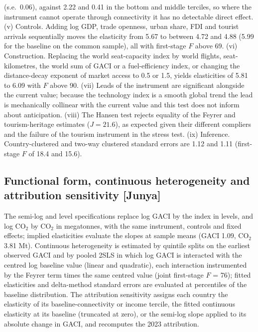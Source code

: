 \documentclass[12pt]{article}
\begin{document}
(s.e.\ 0.06), against 2.22 and 0.41 in the bottom and middle terciles, so
where the instrument cannot operate through connectivity it has no
detectable direct effect. (v) Controls. Adding log GDP, trade openness,
urban share, FDI and tourist arrivals sequentially moves the elasticity
from 5.67 to between 4.72 and 4.88 (5.99 for the baseline on the common
sample), all with first-stage $F$ above 69. (vi) Construction. Replacing
the world seat-capacity index by world flights, seat-kilometres, the world
sum of GACI or a fuel-efficiency index, or changing the distance-decay
exponent of market access to 0.5 or 1.5, yields elasticities of 5.81 to
6.09 with $F$ above 90. (vii) Leads of the instrument are significant
alongside the current value; because the technology index is a smooth
global trend the lead is mechanically collinear with the current value and
this test does not inform about anticipation. (viii) The Hansen test
rejects equality of the Feyrer and tourism-heritage estimates ($J =
21.6$), as expected given their different compliers and the failure of the
tourism instrument in the stress test. (ix) Inference. Country-clustered
and two-way clustered standard errors are 1.12 and 1.11 (first-stage $F$
of 18.4 and 15.6).

\subsection*{Functional form, continuous heterogeneity and attribution
sensitivity [Junya]}
The semi-log and level specifications replace log GACI by the index in
levels, and log CO$_2$ by CO$_2$ in megatonnes, with the same instrument,
controls and fixed effects; implied elasticities evaluate the slopes at
sample means (GACI 1.09, CO$_2$ 3.81 Mt). Continuous heterogeneity is
estimated by quintile splits on the earliest observed GACI and by pooled
2SLS in which log GACI is interacted with the centred log baseline value
(linear and quadratic), each interaction instrumented by the Feyrer term
times the same centred value (joint first-stage $F$ = 76); fitted
elasticities and delta-method standard errors are evaluated at percentiles
of the baseline distribution. The attribution sensitivity assigns each
country the elasticity of its baseline-connectivity or income tercile, the
fitted continuous elasticity at its baseline (truncated at zero), or the
semi-log slope applied to its absolute change in GACI, and recomputes the
2023 attribution.
\end{document}
